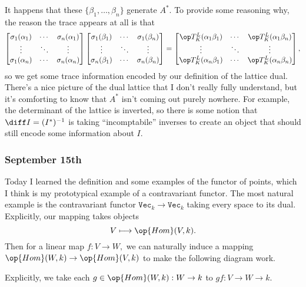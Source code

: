 It happens that these $\{\beta_1,\ldots,\beta_n\}$ generate $A^*.$ To provide some reasoning why, the reason the trace appears at all is that
\[\begin{bmatrix}
    \sigma_1(\alpha_1) & \cdots & \sigma_n(\alpha_1) \\
    \vdots & \ddots & \vdots \\
    \sigma_1(\alpha_n) & \cdots & \sigma_n(\alpha_n)
\end{bmatrix}
\begin{bmatrix}
    \sigma_1(\beta_1) & \cdots & \sigma_1(\beta_n) \\
    \vdots & \ddots & \vdots \\
    \sigma_n(\beta_1) & \cdots & \sigma_n(\beta_n)
\end{bmatrix}=
\begin{bmatrix}
    \op T_K^L(\alpha_1\beta_1) & \cdots & \op T_K^L(\alpha_1\beta_n) \\
    \vdots & \ddots & \vdots \\
    \op T_K^L(\alpha_n\beta_1) & \cdots & \op T_K^L(\alpha_n\beta_n)
\end{bmatrix},\]
so we get some trace information encoded by our definition of the lattice dual. There's a nice picture of the dual lattice that I don't really fully understand, but it's comforting to know that $A^*$ isn't coming out purely nowhere. For example, the determinant of the lattice is inverted, so there is some notion that $\diff I=(I^*)^{-1}$ is taking ``incomptabile'' inverses to create an object that should still encode some information about $I.$

\subsubsection{September 15th}
Today I learned the definition and some examples of the functor of points, which I think is my prototypical example of a contravariant functor. The most natural example is the contravariant functor $\texttt{Vec}_k\to\texttt{Vec}_k$ taking every space to its dual. Explicitly, our mapping takes objects
\[V\longmapsto\op{Hom}(V, k).\]
Then for a linear map $f:V\to W,$ we can naturally induce a mapping $\op{Hom}(W,k)\to\op{Hom}(V,k)$ to make the following diagram work.
\begin{center}
\end{center}
Explicitly, we take each $g\in\op{Hom}(W,k):W\to k$ to $gf:V\to W\to k.$

